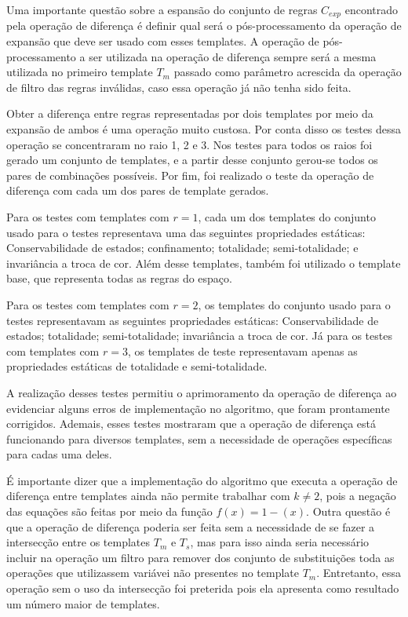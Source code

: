 Uma importante questão sobre a espansão do conjunto de regras $C_{exp}$ encontrado pela operação de diferença é definir qual será o pós-processamento da operação de expansão que deve ser usado com esses templates. A operação de pós-processamento a ser utilizada na operação de diferença sempre será a mesma utilizada no primeiro template $T_m$ passado como parâmetro acrescida da operação de filtro das regras inválidas, caso essa operação já não tenha sido feita.

Obter a diferença entre regras representadas por dois templates por meio da expansão de ambos é uma operação muito custosa. Por conta disso os testes dessa operação se concentraram no raio 1, 2 e 3. Nos testes para todos os raios foi gerado um conjunto de templates, e a partir desse conjunto gerou-se todos os pares de combinações possíveis. Por fim, foi realizado o teste da operação de diferença com cada um dos pares de template gerados.

Para os testes com templates com $r = 1$, cada um dos templates do conjunto usado para o testes representava uma das seguintes propriedades estáticas: Conservabilidade de estados; confinamento; totalidade; semi-totalidade; e invariância a troca de cor. Além desse templates, também foi utilizado o template base, que representa todas as regras do espaço.

Para os testes com templates com $r = 2$, os templates do conjunto usado para o testes representavam as seguintes propriedades estáticas: Conservabilidade de estados; totalidade; semi-totalidade; invariância a troca de cor. Já para os testes com templates com $r = 3$, os templates de teste representavam apenas as propriedades estáticas de totalidade e semi-totalidade.

A realização desses testes permitiu o aprimoramento da operação de diferença ao evidenciar alguns erros de implementação no algoritmo, que foram prontamente corrigidos. Ademais, esses testes mostraram que a operação de diferença está funcionando para diversos templates, sem a necessidade de operações específicas para cadas uma deles.

É importante dizer que a implementação do algoritmo que executa a operação de diferença entre templates ainda não permite trabalhar com $k\neq 2$, pois a negação das equações são feitas por meio da função $f(x) = 1 - (x)$. Outra questão é que a operação de diferença poderia ser feita sem a necessidade de se fazer a intersecção entre os templates $T_m$ e $T_s$, mas para isso ainda seria necessário incluir na operação um filtro para remover dos conjunto de substituições toda as operações que utilizassem variávei não presentes no template $T_m$. Entretanto, essa operação sem o uso da intersecção foi preterida pois ela apresenta como resultado um número maior de templates. 


